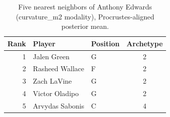 \begin{table}[htbp]
  \centering\small
  \begin{tabular}{rllc}
    \toprule
    Rank & Player & Position & Archetype \\
    \midrule
    1 & Jalen Green & G & 2 \\
    2 & Rasheed Wallace & F & 2 \\
    3 & Zach LaVine & G & 2 \\
    4 & Victor Oladipo & G & 2 \\
    5 & Arvydas Sabonis & C & 4 \\
    \bottomrule
  \end{tabular}
  \caption{Five nearest neighbors of Anthony Edwards (curvature_m2 modality), Procrustes-aligned posterior mean.}
  \label{tab:Anthony_Edwards_neighbors_curvature_m2}
\end{table}

